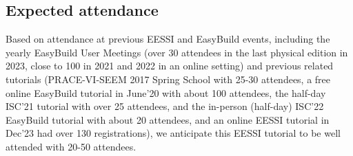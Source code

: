 \subsection*{Expected attendance}

Based on attendance at previous EESSI and EasyBuild events, including the yearly EasyBuild User Meetings (over 30
attendees in the last physical edition in 2023, close to 100 in 2021 and 2022 in an online setting) and previous
related tutorials (PRACE-VI-SEEM 2017 Spring School with 25-30 attendees, a free online EasyBuild tutorial in June'20
with about 100 attendees, the half-day ISC'21 tutorial with over 25 attendees, and the in-person (half-day) ISC'22
EasyBuild tutorial with about 20 attendees, and an online EESSI tutorial in Dec'23 had over 130 registrations), we
anticipate this EESSI tutorial to be well attended with 20-50 attendees.



